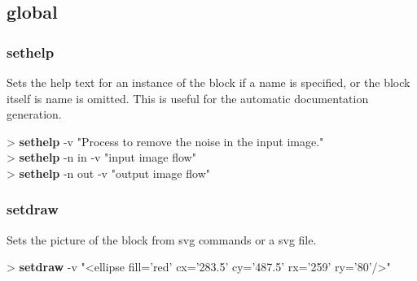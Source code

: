 \documentclass[10pt,a4paper]{article}
\begin{document}
\subsection{global}
\subsubsection{sethelp}

Sets the help text for an instance of the block if a name is specified, or the block itself is name is omitted. This is useful for the automatic documentation generation. \\


\begin{sampletitle}
> \textbf{\tool{} sethelp} -v "Process to remove the noise in the input image." \\
> \textbf{\tool{} sethelp} -n in -v "input image flow" \\
> \textbf{\tool{} sethelp} -n out -v "output image flow"
\end{sampletitle}

\subsubsection{setdraw}

Sets the picture of the block from svg commands or a svg file. \\


\begin{sampletitle}[1]
> \textbf{\tool{} setdraw} -v "<ellipse fill='red' cx='283.5' cy='487.5' rx='259' ry='80'/>"
\end{sampletitle}
\end{document}
